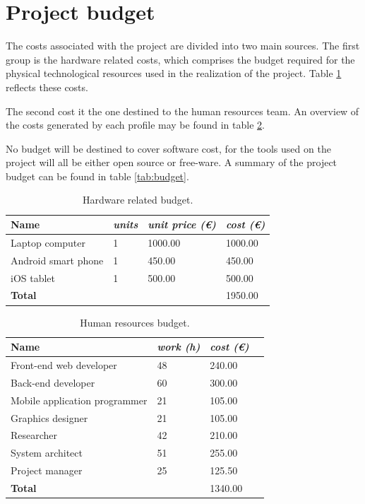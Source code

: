 \newpage
\FloatBarrier
\section{Project budget}

The costs associated with the project are divided into two main sources. The first group is the hardware related costs, which comprises the budget required for the physical technological resources used in the realization of the project. Table \ref{tab:hardware} reflects these costs.

The second cost it the one destined to the human resources team. An overview of the costs generated by each profile may be found in table \ref{tab:hhrr}.

No budget will be destined to cover software cost, for the tools used on the project will all be either open source or free-ware. A summary of the project budget can be found in table \ref{tab:budget}.

\begin{table}[ht]
  \centering
  \caption{Hardware related budget.}\label{tab:hardware}
  \begin{tabular}{llll}
    \toprule
      \textbf{Name} & \emph{units}  & \emph{unit price (\euro)} & \emph{cost (\euro)}\\
    \midrule
      Laptop computer & 1 & 1000.00 & 1000.00\\
	  Android smart phone & 1 & 450.00 & 450.00\\
	  iOS tablet & 1 & 500.00 & 500.00\\
    \bottomrule
      \textbf{Total} & & & 1950.00\\
  \end{tabular}
\end{table}


\begin{table}[ht]
  \centering
  \caption{Human resources budget.}\label{tab:hhrr}
  \begin{tabular}{llll}
    \toprule
      \textbf{Name} & \emph{work (h)} & \emph{cost (\euro)}\\
    \midrule
      Front-end web developer & 48  & 240.00\\
	  Back-end developer & 60 & 300.00 \\
	  Mobile application programmer & 21 & 105.00\\
	  Graphics designer & 21 & 105.00\\
	  Researcher & 42 & 210.00\\
	  System architect & 51 & 255.00\\
      Project manager & 25 & 125.50\\
    \bottomrule
      \textbf{Total} & & 1340.00\\
  \end{tabular}
\end{table}

